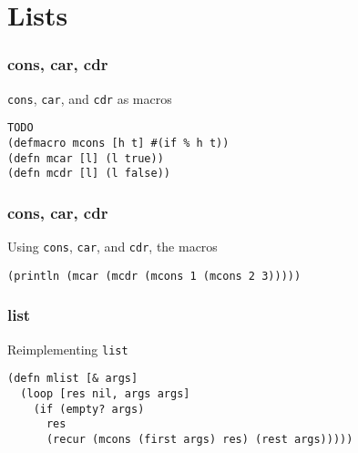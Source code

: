 \documentclass[aspectratio=169]{beamer}
\begin{document}
  \section{Lists}
  \begin{frame}[fragile]
    \frametitle{cons, car, cdr}
    \begin{listing}[H]
      \caption{\texttt{cons}, \texttt{car}, and \texttt{cdr} as macros}
      \begin{verbatim}
TODO
(defmacro mcons [h t] #(if % h t))
(defn mcar [l] (l true))
(defn mcdr [l] (l false))
      \end{verbatim}
    \end{listing}
  \end{frame}
  \begin{frame}[fragile]
    \frametitle{cons, car, cdr}
    \begin{listing}[H]
      \caption{Using \texttt{cons}, \texttt{car}, and \texttt{cdr}, the macros}
      \begin{verbatim}
(println (mcar (mcdr (mcons 1 (mcons 2 3)))))
      \end{verbatim}
    \end{listing}
  \end{frame}
  \begin{frame}[fragile]
    \frametitle{list}
    \begin{listing}[H]
      \caption{Reimplementing \texttt{list}}
      \begin{verbatim}
(defn mlist [& args]
  (loop [res nil, args args]
    (if (empty? args)
      res
      (recur (mcons (first args) res) (rest args)))))
      \end{verbatim}
    \end{listing}
  \end{frame}
\end{document}
